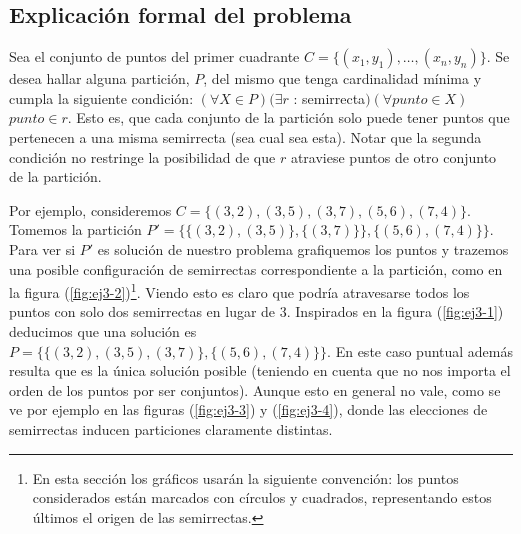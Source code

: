\subsection{Explicación formal del problema}
\label{subsec:problema3}
Sea el conjunto de puntos del primer cuadrante $C = \{(x_1, y_1), \hdots, (x_n, y_n)\}$. Se desea hallar alguna partición, $P$, del mismo que tenga cardinalidad mínima y cumpla la siguiente condición: $(\forall X \in P) (\exists r$ : semirrecta$) (\forall punto \in X)$ $punto \in r$. Esto es, que cada conjunto de la partición solo puede tener puntos que pertenecen a una misma semirrecta (sea cual sea esta). 
Notar que la segunda condición no restringe la posibilidad de que $r$ atraviese puntos de otro conjunto de la partición. 

Por ejemplo, consideremos $C=\{(3,2), (3,5), (3,7), (5,6), (7,4)\}$. Tomemos la partición $P' = \{\{(3,2), (3,5)\}, \{(3,7)\}\},\{(5,6), (7,4)\}\}$. Para ver si $P'$ es solución de nuestro problema grafiquemos los puntos y trazemos una posible configuración de semirrectas correspondiente a la partición, como en la figura (\ref{fig:ej3-2})\footnote{En esta sección los gráficos usarán la siguiente convención: los puntos considerados están marcados con círculos y cuadrados, representando estos últimos el origen de las semirrectas. }. Viendo esto es claro que podría atravesarse todos los puntos con solo dos semirrectas en lugar de 3. Inspirados en la figura (\ref{fig:ej3-1}) deducimos que una solución es $P = \{\{(3,2), (3,5), (3,7)\},\{(5,6), (7,4)\}\}$. En este caso puntual además resulta que es la única solución posible (teniendo en cuenta que no nos importa el orden de los puntos por ser conjuntos). Aunque esto en general no vale, como se ve por ejemplo en las figuras (\ref{fig:ej3-3}) y (\ref{fig:ej3-4}), donde las elecciones de semirrectas inducen particiones claramente distintas.

